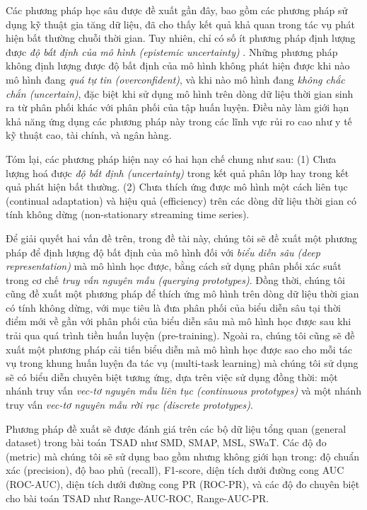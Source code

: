 {Các phương pháp học sâu được đề xuất gần đây, bao gồm các phương pháp sử dụng kỹ thuật gia tăng dữ liệu, đã cho thấy kết quả khả quan trong tác vụ phát hiện bất thường chuỗi thời gian. Tuy nhiên, chỉ có số ít phương pháp định lượng được \textit{độ bất định của mô hình (epistemic uncertainty)} \cite{10.1145/3637528.3671936}. Những phương pháp không định lượng được độ bất định của mô hình không phát hiện được khi nào mô hình đang \textit{quá tự tin (overconfident)}, và khi nào mô hình đang \textit{không chắc chắn (uncertain)}, đặc biệt khi sử dụng mô hình trên dòng dữ liệu thời gian sinh ra từ phân phối khác với phân phối của tập huấn luyện. Điều này làm giới hạn khả năng ứng dụng các phương pháp này trong các lĩnh vực rủi ro cao như y tế kỹ thuật cao, tài chính, và ngân hàng.

Tóm lại, các phương pháp hiện nay có hai hạn chế chung như sau: \newline
(1) Chưa lượng hoá được \textit{độ bất định (uncertainty)} trong kết quả phân lớp hay trong kết quả phát hiện bất thường. \newline
(2) Chưa thích ứng được mô hình một cách liên tục (continual adaptation) và hiệu quả (efficiency) trên các dòng dữ liệu thời gian có tính không dừng (non-stationary streaming time series).

Để giải quyết hai vấn đề trên, trong đề tài này, chúng tôi sẽ đề xuất một phương pháp để định lượng độ bất định của mô hình đối với \textit{biểu diễn sâu (deep representation)} mà mô hình học được, bằng cách sử dụng phân phối xác suất trong cơ chế \textit{truy vấn nguyên mẫu (querying prototypes)}. Đồng thời, chúng tôi cũng đề xuất một phương pháp để thích ứng mô hình trên dòng dữ liệu thời gian có tính không dừng, với mục tiêu là đưa phân phối của biểu diễn sâu tại thời điểm mới về gần với phân phối của biểu diễn sâu mà mô hình học được sau khi trải qua quá trình tiền huấn luyện (pre-training). Ngoài ra, chúng tôi cũng sẽ đề xuất một phương pháp cải tiến biểu diễn mà mô hình học được sao cho mỗi tác vụ trong khung huấn luyện đa tác vụ (multi-task learning) mà chúng tôi sử dụng sẽ có biểu diễn chuyên biệt tương ứng, dựa trên việc sử dụng đồng thời: một nhánh truy vấn \textit{vec-tơ nguyên mẫu liên tục (continuous prototypes)} và một nhánh truy vấn \textit{vec-tơ nguyên mẫu rời rạc (discrete prototypes)}.

Phương pháp đề xuất sẽ được đánh giá trên các bộ dữ liệu tổng quan (general dataset) trong bài toán TSAD như SMD, SMAP, MSL, SWaT. Các độ đo (metric) mà chúng tôi sẽ sử dụng bao gồm nhưng không giới hạn trong: độ chuẩn xác (precision), độ bao phủ (recall), F1-score, diện tích dưới đường cong AUC (ROC-AUC), diện tích dưới đường cong PR (ROC-PR), và các độ đo chuyên biệt cho bài toán TSAD như Range-AUC-ROC, Range-AUC-PR.

}
